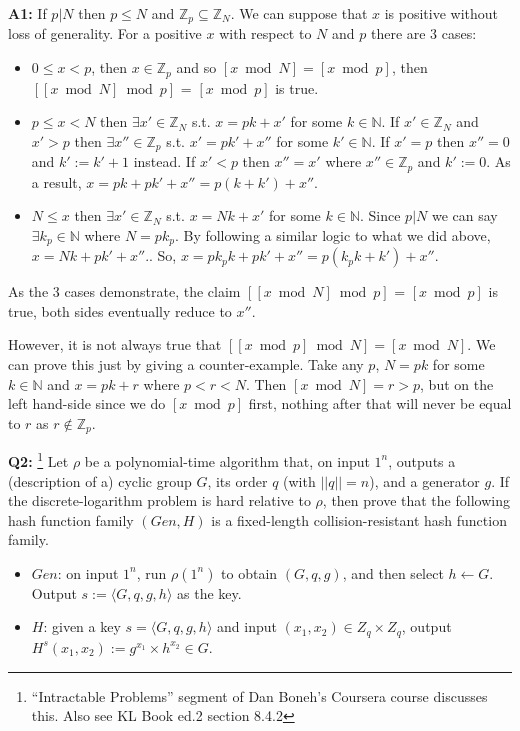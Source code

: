 \documentclass[12pt,reqno]{amsart}
\begin{document}
\textbf{A1:} If $p | N$ then $p \leq N$ and $\mathbb{Z}_p \subseteq \mathbb{Z}_N$. We can suppose that $x$ is positive without loss of generality. For a positive $x$ with respect to $N$ and $p$ there are 3 cases:
\begin{itemize}
	\item $0 \leq x < p$, then $x \in \mathbb{Z}_p$ and so $[x \bmod N]=[x \bmod p]$, then $[[x \bmod N] \bmod p]$ = $[x \bmod p]$ is true.
	\item $p \leq x < N$ then $\exists x' \in  \mathbb{Z}_N$ s.t. $x = pk + x'$ for some $k \in \mathbb{N}$. If $x' \in  \mathbb{Z}_N$ and $x' > p$ then $\exists x'' \in \mathbb{Z}_p$ s.t. $x' = pk' + x''$ for some $k' \in \mathbb{N}$. If $x'=p$ then $x''=0$ and $k':=k'+1$ instead. If $x'<p$ then $x''=x'$ where $x'' \in \mathbb{Z}_p$ and $k':=0$. As a result,  $x = pk + pk' + x'' = p(k+k') + x''$. 
	\item $N \leq x$  then $\exists x' \in  \mathbb{Z}_N$ s.t. $x = Nk + x'$ for some $k \in \mathbb{N}$.  Since $p | N$ we can say $\exists k_p \in \mathbb{N}$ where $N=pk_p$. By following a similar logic to what we did above, $x = Nk + pk' + x''$.. So, $x = pk_pk + pk' + x'' = p(k_pk+k') + x''$.
\end{itemize}
As the 3 cases demonstrate, the claim $[[x \bmod N] \bmod p]$ = $[x \bmod p]$ is true, both sides eventually reduce to $x''$.

 However, it is not always true that $[[x \bmod p] \bmod N] = [x \bmod N]$. We can prove this just by giving a counter-example. Take any $p$, $N = pk$ for some $k \in \mathbb{N}$ and $x=pk+r$ where $p < r < N$. Then $[x \bmod N]=r > p$, but on the left hand-side since we do $[x \bmod p]$ first, nothing after that will never be equal to $r$ as $r \not\in \mathbb{Z}_p$.

\newpage
\textbf{Q2:} \footnote{``Intractable Problems'' segment of Dan Boneh's Coursera course discusses this. Also see KL Book ed.2 section 8.4.2} Let $\rho$ be a polynomial-time algorithm that, on input $1^n$, outputs a (description of a) cyclic group $G$, its order $q$ (with $||q||=n$), and a generator $g$.
If the discrete-logarithm problem is hard relative to $\rho$, then prove that the following hash function family $(Gen, H)$ is a fixed-length collision-resistant hash function family.
\begin{itemize}
	\item $Gen$: on input $1^n$, run $\rho(1^n)$ to obtain $(G,q,g)$, and then select $h\gets G$. Output $s:=\langle G,q,g,h\rangle$ as the key.
	\item $H$: given a key $s=\langle G,q,g,h \rangle$ and input $(x_1, x_2) \in Z_q \times Z_q$, output $H^s(x_1, x_2) := g^{x_1} \times h^{x_2} \in G$.
\end{itemize}
    
\end{document}
